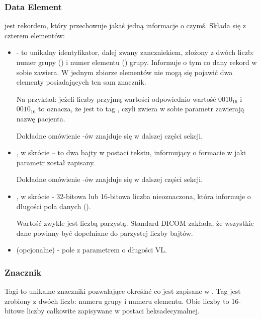 \subsubsection{Data Element}

 jest rekordem, który przechowuje jakaś jedną informacje o czymś.
Składa się z czterem elementów:

\begin{itemize}

    \item {} - to unikalny identyfikator, dalej zwany zanczniekiem, złożony z dwóch liczb: numer grupy () i numer elementu () grupy.
    Informuje o tym co dany rekord w sobie zawiera.
    W jednym zbiorze elementów nie mogą się pojawić dwa elementy posiadających ten sam znacznik.

    Na przykład: jeżeli liczby  przyjmą wartości odpowiednio wartość $0010_{16}$ i $0010_{16}$ to oznacza, że jest to tag , czyli zwiera w sobie parametr zawierają nazwę pacjenta.

    Dokładne omówienie -ów znajduje się w dalszej części sekcji.

    \item {}, w skrócie  – to dwa bajty w postaci tekstu, informujący o formacie w jaki parametr został zapisany.
    
    Dokładne omówienie -ów znajduje się w dalszej części sekcji.

    \item {}, w skrócie  - 32-bitowa lub 16-bitowa liczba nieoznaczona, która informuje o długości pola danych ().
    
    Wartość  zwykle jest liczbą parzystą.
    Standard DICOM zakłada, że wszystkie dane powinny być dopełniane do parzystej liczby bajtów.
    
    \item {} (opcjonalne) - pole z parametrem o długości VL.
    
\end{itemize}

\subsubsection{Znacznik}
\label{sec:dicom-tag}

Tagi to unikalne znaczniki pozwalające określać co jest zapisane w .
Tag jest zrobiony z dwóch liczb: numeru grupy i numeru elementu.
Obie liczby to 16-bitowe liczby całkowite zapisywane w postaci  heksadecymalnej.

